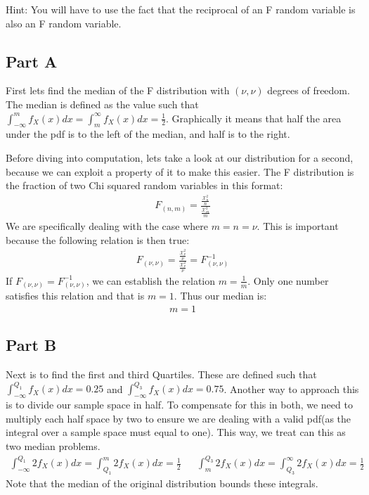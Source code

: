 \documentclass{article}
\begin{document}
Hint: You will have to use the fact that the reciprocal of an F random variable is also an F random
variable.

\subsection*{Part A}
First lets find the median of the F distribution with $(\nu, \nu)$ degrees of freedom. The median is defined as the value such that $\int_{-\infty}^{m} f_X(x) dx = \int_{m}^{\infty} f_X(x) dx = \frac{1}{2}$. Graphically it means that half the area under the pdf is to the left of the median, and half is to the right.

Before diving into computation, lets take a look at our distribution for a second, because we can exploit a property of it to make this easier. The F distribution is the fraction of two Chi squared random variables in this format:
\begin{align*}
F_{(n,m)} = \frac{\tfrac{\mathcal{X}_n^2}{n}}{\tfrac{\mathcal{X}_m^2}{m}}
\end{align*}
We are specifically dealing with the case where $m=n=\nu$. This is important because the following relation is then true:
\begin{align*}
F_{(\nu,\nu)} = \frac{\tfrac{\mathcal{X}_\nu^2}{\nu}}{\tfrac{\mathcal{X}^2_\nu}{\nu}} = F_{(\nu,\nu)}^{-1}
\end{align*}
If $F_{(\nu,\nu)}=F_{(\nu,\nu)}^{-1}$, we can establish the relation $m=\tfrac{1}{m}$. Only one number satisfies this relation and that is $m=1$. Thus our median is:
\begin{align*}
\boxed{m=1}
\end{align*}
\subsection*{Part B}
Next is to find the first and third Quartiles. These are defined such that $\int_{-\infty}^{Q_1} f_X(x) dx=0.25$ and $\int_{-\infty}^{Q_3} f_X(x) dx=0.75$. Another way to approach this is to divide our sample space in half. To compensate for this in both, we need to multiply each half space by two to ensure we are dealing with a valid pdf(as the integral over a sample space must equal to one). This way, we treat can this as two median problems.
\begin{align*}
\int_{-\infty}^{Q_1} 2f_X(x) dx = \int_{Q_1}^{m} 2f_X(x) dx = \frac{1}{2} && \int_{m}^{Q_3} 2f_X(x) dx = \int_{Q_3}^{\infty} 2f_X(x) dx = \frac{1}{2}
\end{align*}
Note that the median of the original distribution bounds these integrals.
\end{document}
